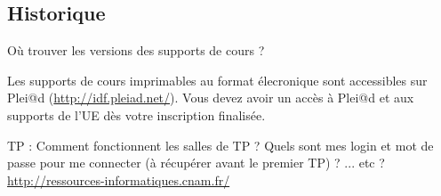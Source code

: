 \subsection{Historique}

\begin{frame}{Où trouver les versions des supports de cours ?}

Les supports de cours imprimables au format élecronique sont accessibles sur Plei@d (\url{http://idf.pleiad.net/}). Vous devez avoir un accès à Plei@d et aux supports de l'UE dès votre inscription finalisée. \\

\bigskip

TP : Comment fonctionnent les salles de TP ? Quels sont mes login et mot de passe pour me connecter (\`a r\'ecup\'erer avant le premier TP) ? ... etc ?
\url{http://ressources-informatiques.cnam.fr/}

\end{frame}

